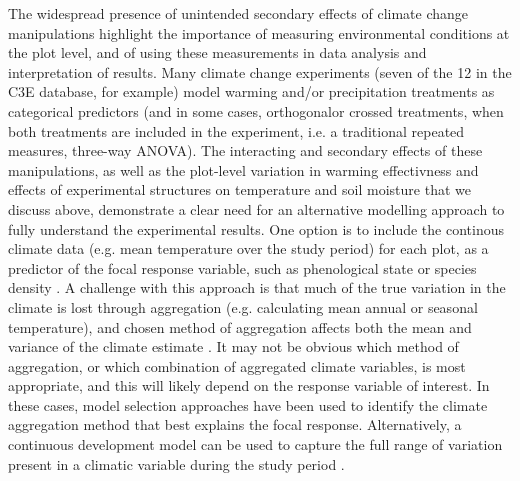 \documentclass{article}
\begin{document}
\par The widespread presence of unintended secondary effects of climate change manipulations highlight the importance of measuring environmental conditions at the plot level, and of using these measurements in data analysis and interpretation of results. Many climate change experiments (seven of the 12 in the C3E database, for example) model warming and/or precipitation treatments as categorical predictors (and in some cases, orthogonalor crossed treatments, when both treatments are included in the experiment, i.e. a traditional repeated measures, three-way ANOVA). The interacting and secondary effects of these manipulations, as well as the plot-level variation in warming effectivness and effects of experimental structures on temperature and soil moisture that we discuss above, demonstrate a clear need for an alternative modelling approach to fully understand the experimental results. One option is to include the continous climate data (e.g. mean temperature over the study period) for each plot, as a predictor of the focal response variable, such as phenological state or species density \citep [e.g.][]{marchin2015, pelini2014}. A challenge with this approach is that much of the true variation in the climate is lost through aggregation (e.g. calculating mean annual or seasonal temperature), and chosen method of aggregation affects both the mean and variance of the climate estimate \citep [e.g.][]{clark2014b}. It may not be obvious which method of aggregation, or which combination of aggregated climate variables, is most appropriate, and this will likely depend on the response variable of interest. In these cases, model selection approaches have been used to identify the climate aggregation method that best explains the focal response\citep [e.g.][]{morin2010}. Alternatively, a continuous development model can be used to capture the full range of variation present in a climatic variable during the study period \citep [e.g.][]{clark2014b}.
\end{document}
